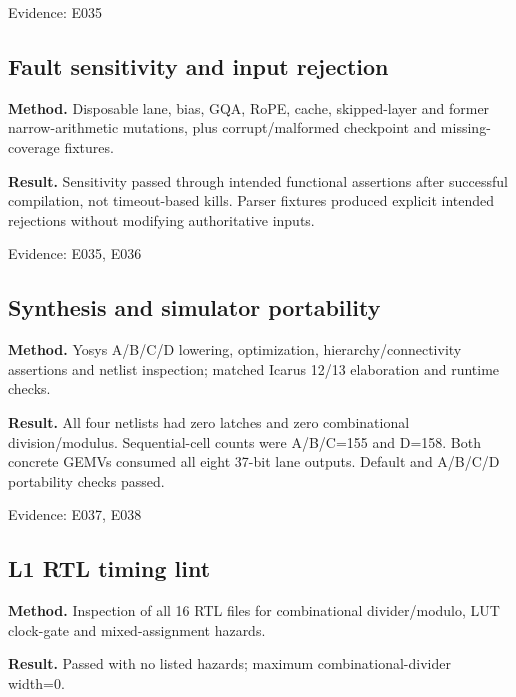 \documentclass[11pt,a4paper]{article}
\begin{document}
{\small Evidence: E035}

\subsection{Fault sensitivity and input rejection}

\textbf{Method.} Disposable lane,\allowbreak{} bias,\allowbreak{} GQA,\allowbreak{} RoPE,\allowbreak{} cache,\allowbreak{} skipped-layer and former narrow-arithmetic mutations,\allowbreak{} plus corrupt/\allowbreak{}malformed checkpoint and missing-coverage fixtures.

\textbf{Result.} Sensitivity passed through intended functional assertions after successful compilation,\allowbreak{} not timeout-based kills. Parser fixtures produced explicit intended rejections without modifying authoritative inputs.

{\small Evidence: E035,\allowbreak{} E036}

\subsection{Synthesis and simulator portability}

\textbf{Method.} Yosys A/\allowbreak{}B/\allowbreak{}C/\allowbreak{}D lowering,\allowbreak{} optimization,\allowbreak{} hierarchy/\allowbreak{}connectivity assertions and netlist inspection; matched Icarus 12/\allowbreak{}13 elaboration and runtime checks.

\textbf{Result.} All four netlists had zero latches and zero combinational division/\allowbreak{}modulus. Sequential-cell counts were A/\allowbreak{}B/\allowbreak{}C=\allowbreak{}155 and D=\allowbreak{}158. Both concrete GEMVs consumed all eight 37-bit lane outputs. Default and A/\allowbreak{}B/\allowbreak{}C/\allowbreak{}D portability checks passed.

{\small Evidence: E037,\allowbreak{} E038}

\subsection{L1 RTL timing lint}

\textbf{Method.} Inspection of all 16 RTL files for combinational divider/\allowbreak{}modulo,\allowbreak{} LUT clock-gate and mixed-assignment hazards.

\textbf{Result.} Passed with no listed hazards; maximum combinational-divider width=\allowbreak{}0.
\end{document}
